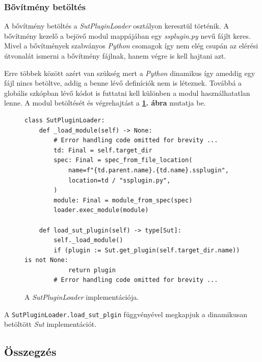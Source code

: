         \subsubsection{Bővítmény betöltés}

            A bővítmény betöltés a \textit{SutPluginLoader} osztályon keresztül történik. A bővítmény kezelő a bejövő
            modul mappájában egy \textit{ssplugin.py} nevű fájlt keres. Mivel a bővítmények szabványos \textit{Python}
            csomagok így nem elég csupán az elérési útvonalát ismerni a bővítmény fájlnak, hanem végre is kell hajtani
            azt.

            Erre többek között azért van szükség mert a \textit{Python} dinamikus így ameddig egy fájl nincs betöltve,
            addig a benne lévő definíciók nem is léteznek. Továbbá a globális szkópban lévő kódot is futtatni kell
            különben a modul használhatatlan lenne. A modul betöltését és végrehajtást a
            \textbf{\ref{fig:module-loder}. ábra} mutatja be.

            \begin{figure}[ht]
                \centering
                \begin{verbatim}
class SutPluginLoader:
    def _load_module(self) -> None:
        # Error handling code omitted for brevity ...
        td: Final = self.target_dir
        spec: Final = spec_from_file_location(
            name=f"{td.parent.name}.{td.name}.ssplugin",
            location=td / "ssplugin.py",
        )
        module: Final = module_from_spec(spec)
        loader.exec_module(module)

    def load_sut_plugin(self) -> type[Sut]:
        self._load_module()
        if (plugin := Sut.get_plugin(self.target_dir.name)) is not None:
            return plugin
        # Error handling code omitted for brevity ...
            \end{verbatim}
                \caption{\label{fig:module-loder} A \textit{SutPluginLoader} implementációja.}
            \end{figure}

            A \verb|SutPluginLoader.load_sut_plgin| függvényével megkapjuk a dinamikusan betöltött \textit{Sut}
            implementációt.

            \pagebreak
    \subsection{Összegzés}

